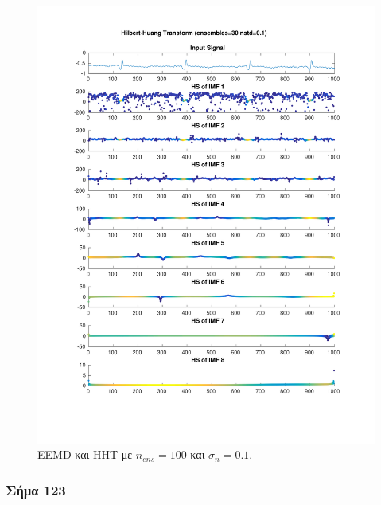 \documentclass[11pt,a4paper]{article}
\begin{document}
\begin{figure}[H]
\begin{minipage}{0.48\textwidth}
	\includegraphics[width=\textwidth]{fig/112l2_hht_ensemble.pdf}
\end{minipage}
\vfill
\caption{EEMD και HHT με $n_{ens}=100$ και $\sigma_n = 0.1$.}
\label{fig:112l2_hht_ensemble}
\end{figure}


\subsubsection*{Σήμα 123}
\end{document}

